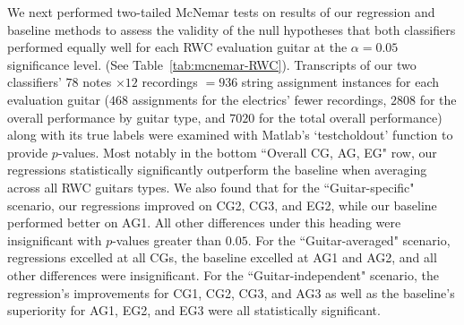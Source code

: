 \documentclass[12pt]{cmuthesis}
\begin{document}
We next performed two-tailed McNemar tests on results of our regression and baseline methods to assess the validity of the null hypotheses that both classifiers performed equally well for each RWC evaluation guitar at the $\alpha = 0.05$ significance level. (See Table~\ref{tab:mcnemar-RWC}). Transcripts of our two classifiers' $78$ notes $\times 12$ recordings $= 936$ string assignment instances for each evaluation guitar ($468$ assignments for the electrics' fewer recordings, $2808$ for the overall performance by guitar type, and $7020$ for the total overall performance) along with its true labels were examined with Matlab's `testcholdout' function to provide $p$-values. Most notably in the bottom ``Overall CG, AG, EG" row, our regressions statistically significantly outperform the baseline when averaging across all RWC guitars types. We also found that for the ``Guitar-specific" scenario, our regressions improved on CG2, CG3, and EG2, while our baseline performed better on AG1. All other differences under this heading were insignificant with $p$-values greater than $0.05$. For the ``Guitar-averaged" scenario, regressions excelled at all CGs, the baseline excelled at AG1 and AG2, and all other differences were insignificant. For the ``Guitar-independent" scenario, the regression's improvements for CG1, CG2, CG3, and AG3 as well as the baseline's superiority for AG1, EG2, and EG3 were all statistically significant. 
\end{document}
